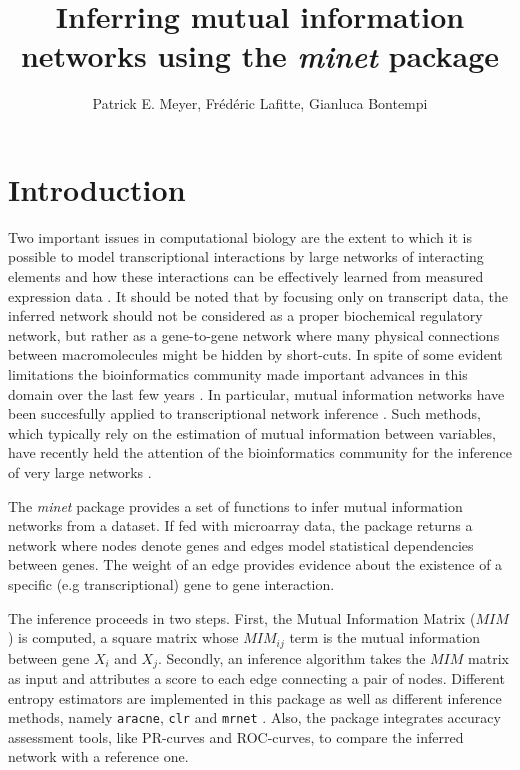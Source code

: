 \documentclass{article}
\newcommand{\Robject}[1]{{\texttt{#1}}}
\newcommand{\Rpackage}[1]{{\textit{#1}}}
\begin{document}
\title{Inferring mutual information networks using the \Rpackage{minet} package}
\author{Patrick E. Meyer, Fr\'ed\'eric Lafitte, Gianluca Bontempi}
\maketitle
\section{Introduction}

Two important issues in computational biology are the extent to      
which it is possible to model transcriptional interactions by large   
networks of interacting elements and how these interactions can be  
effectively learned from measured expression data \cite{vansomeren}. It should     
be noted that by focusing only on transcript data, the inferred     
network should not be considered as a proper biochemical regulatory 
network, but rather as a gene-to-gene network where many     
physical connections between macromolecules might be hidden by
short-cuts. In spite of some evident limitations the bioinformatics
 community made important advances in this domain over the
last few years \cite{gardner,schafer}. In particular, mutual information networks
have been succesfully applied to transcriptional network inference
\cite{aracne,clr}. Such methods, which typically rely on the estimation of
mutual information between variables, have recently held the attention
 of the bioinformatics community for the inference of very large
networks \cite{relnet,aracne,clr,papier}.

The \Rpackage{minet} package provides a set of functions to infer 
mutual information networks from a dataset. If fed with microarray 
data, the package returns a network where nodes denote genes and 
edges model statistical dependencies between genes. 
The weight of an edge provides evidence about the existence 
of a specific (e.g transcriptional) gene to gene interaction. 

The inference proceeds in two steps. First, the Mutual Information
Matrix ($MIM$) is computed, a  square matrix whose $MIM_{ij}$ term is the mutual 
information between gene $X_i$ and $X_j$. Secondly, an inference algorithm
takes the $MIM$ matrix as input and attributes a score to each edge
connecting a pair of nodes. Different entropy estimators are implemented 
in this package as well as different inference methods, namely
\Robject{aracne}, \Robject{clr} and \Robject{mrnet} \cite{aracne,clr,papier}. 
Also, the package integrates accuracy assessment tools, like PR-curves and ROC-curves, 
to compare the inferred network with a reference one.
\end{document}
